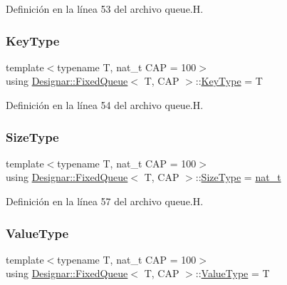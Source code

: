 Definición en la línea 53 del archivo queue.\+H.

\mbox{\label{class_designar_1_1_fixed_queue_a37999fa3f2fa0aacaf67d94e6da50f3d}} 
\subsubsection{\texorpdfstring{Key\+Type}{KeyType}}
{\footnotesize\ttfamily template$<$typename T, nat\+\_\+t C\+AP = 100$>$ \\
using \hyperlink{class_designar_1_1_fixed_queue}{Designar\+::\+Fixed\+Queue}$<$ T, C\+AP $>$\+::\hyperlink{class_designar_1_1_fixed_queue_a37999fa3f2fa0aacaf67d94e6da50f3d}{Key\+Type} =  T}



Definición en la línea 54 del archivo queue.\+H.

\mbox{\label{class_designar_1_1_fixed_queue_a900c2a6d70517602bd8bc9dc7894c104}} 
\subsubsection{\texorpdfstring{Size\+Type}{SizeType}}
{\footnotesize\ttfamily template$<$typename T, nat\+\_\+t C\+AP = 100$>$ \\
using \hyperlink{class_designar_1_1_fixed_queue}{Designar\+::\+Fixed\+Queue}$<$ T, C\+AP $>$\+::\hyperlink{class_designar_1_1_fixed_queue_a900c2a6d70517602bd8bc9dc7894c104}{Size\+Type} =  \hyperlink{namespace_designar_aa72662848b9f4815e7bf31a7cf3e33d1}{nat\+\_\+t}}



Definición en la línea 57 del archivo queue.\+H.

\mbox{\label{class_designar_1_1_fixed_queue_a3507ad9a592d5ade2c7cfe0b9484a4b0}} 
\subsubsection{\texorpdfstring{Value\+Type}{ValueType}}
{\footnotesize\ttfamily template$<$typename T, nat\+\_\+t C\+AP = 100$>$ \\
using \hyperlink{class_designar_1_1_fixed_queue}{Designar\+::\+Fixed\+Queue}$<$ T, C\+AP $>$\+::\hyperlink{class_designar_1_1_fixed_queue_a3507ad9a592d5ade2c7cfe0b9484a4b0}{Value\+Type} =  T}



